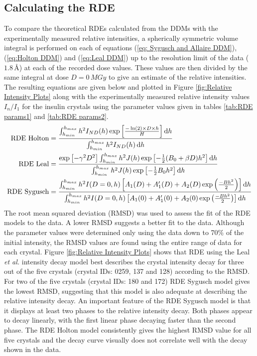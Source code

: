 \subsection{Calculating the RDE}
\label{sub:Calculating the RDE}
To compare the theoretical RDEs calculated from the DDMs with the experimentally measured relative intensities, a spherically symmetric volume integral is performed on each of equations (\ref{eq: Sygusch and Allaire DDM}), (\ref{eq:Holton DDM}) and (\ref{eq:Leal DDM}) up to the resolution limit of the data ($1.8\,$\AA) at each of the recorded dose values.
These values are then divided by the same integral at dose $D = 0\,MGy$ to give an estimate of the relative intensities.
The resulting equations are given below and plotted in Figure \ref{fig:Relative Intensity Plots} along with the experimentally measured relative intensity values $I_n/I_1$ for the insulin crystals using the parameter values given in tables \ref{tab:RDE params1} and \ref{tab:RDE params2}.
\begin{align}
\text{RDE Holton} &= \frac{\int^{h_{max}}_{h_{min}}{h^2 I_{ND}(h) \exp \left[ \frac{- \ln(2) \times D \times h}{H}\right]}\, \mathrm{d} h}{\int^{h_{max}}_{h_{min}}{h^2 I_{ND}(h)}\, \mathrm{d} h} \label{eqrdeholt}\\
\text{RDE Leal} &= \frac{\exp\left[ -\gamma^2 D^2 \right] \int^{h_{max}}_{h_{min}}{h^2 J(h) \exp\left[ -\frac{1}{2}(B_0 + \beta D)h^2\right]}\, \mathrm{d} h }{\int^{h_{max}}_{h_{min}}{h^2 J(h) \exp\left[ -\frac{1}{2} B_0 h^2\right]}\, \mathrm{d} h }  \label{eqrdeleal}\\
\text{RDE Sygusch} &= \frac{\int^{h_{max}}_{h_{min}}{h^2 I(D=0,h) \left[ A_1(D) + A'_1(D) + A_2(D) \exp\left( \frac{-B h^2}{2}\right)\right]}\, \mathrm{d} h}{\int^{h_{max}}_{h_{min}}{h^2 I(D=0,h) \left[ A_1(0) + A'_1(0) + A_2(0) \exp\left( \frac{-B h^2}{2}\right)\right]}\, \mathrm{d} h} \label{eqrdesyg}
\end{align}
The root mean squared deviation (RMSD) was used to assess the fit of the RDE models to the data.
A lower RMSD suggests a better fit to the data.
Although the parameter values were determined only using the data down to 70\% of the initial intensity, the RMSD values are found using the entire range of data for each crystal.
Figure \ref{fig:Relative Intensity Plots} shows that RDE using the Leal \textit{et al.} intensity decay model best describes the crystal intensity decay for three out of the five crystals (crystal IDs: 0259, 137 and 128) according to the RMSD.
For two of the five crystals (crystal IDs: 180 and 172) RDE Sygusch model gives the lowest RMSD, suggesting that this model is also adequate at describing the relative intensity decay.
An important feature of the RDE Sygusch model is that it displays at least two phases to the relative intensity decay.
Both phases appear to decay linearly, with the first linear phase decaying faster than the second phase.
The RDE Holton model consistently gives the highest RMSD value for all five crystals and the decay curve visually does not correlate well with the decay shown in the data.

